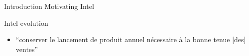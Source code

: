 %
\begin{Frame}{Introduction Motivating Intel}
      \begin{block}{Intel evolution}

        \begin{itemize}
        \item ``conserver le lancement de produit annuel nécessaire à
          la bonne tenue [des] ventes''
        \end{itemize}
      \end{block} 
\end{Frame}


